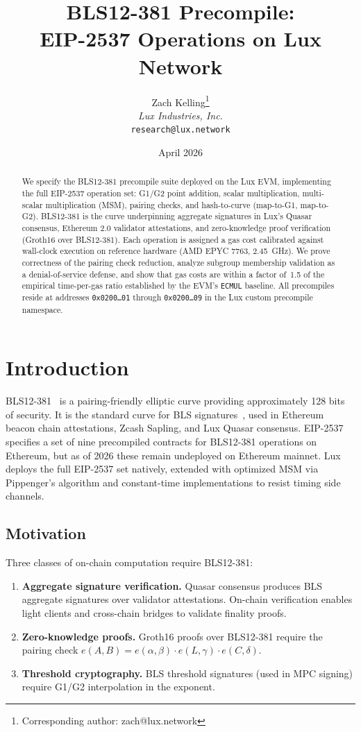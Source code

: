 \documentclass[11pt,a4paper]{article}
\title{BLS12-381 Precompile:\\EIP-2537 Operations on Lux Network}
\author{
Zach Kelling\thanks{Corresponding author: zach@lux.network}\\
\textit{Lux Industries, Inc.}\\
\texttt{research@lux.network}
}
\date{April 2026}
\begin{document}
\luxcoverpage

\begin{abstract}
We specify the BLS12-381 precompile suite deployed on the Lux EVM, implementing the full
EIP-2537 operation set: G1/G2 point addition, scalar multiplication, multi-scalar
multiplication (MSM), pairing checks, and hash-to-curve (map-to-G1, map-to-G2).
BLS12-381 is the curve underpinning aggregate signatures in Lux's Quasar consensus,
Ethereum 2.0 validator attestations, and zero-knowledge proof verification (Groth16
over BLS12-381). Each operation is assigned a gas cost calibrated against wall-clock
execution on reference hardware (AMD EPYC 7763, 2.45~GHz). We prove correctness of
the pairing check reduction, analyze subgroup membership validation as a
denial-of-service defense, and show that gas costs are within a factor of~1.5 of
the empirical time-per-gas ratio established by the EVM's \texttt{ECMUL} baseline.
All precompiles reside at addresses \texttt{0x0200\ldots01} through \texttt{0x0200\ldots09}
in the Lux custom precompile namespace.
\end{abstract}

\section{Introduction}

BLS12-381~\cite{bls12-381} is a pairing-friendly elliptic curve providing approximately
128 bits of security. It is the standard curve for BLS signatures~\cite{bls-sigs},
used in Ethereum beacon chain attestations, Zcash Sapling, and Lux Quasar consensus.
EIP-2537~\cite{eip2537} specifies a set of nine precompiled contracts for BLS12-381
operations on Ethereum, but as of 2026 these remain undeployed on Ethereum mainnet.
Lux deploys the full EIP-2537 set natively, extended with optimized MSM via Pippenger's
algorithm and constant-time implementations to resist timing side channels.

\subsection{Motivation}

Three classes of on-chain computation require BLS12-381:

\begin{enumerate}[label=(\roman*)]
  \item \textbf{Aggregate signature verification.} Quasar consensus produces BLS
    aggregate signatures over validator attestations. On-chain verification enables
    light clients and cross-chain bridges to validate finality proofs.
  \item \textbf{Zero-knowledge proofs.} Groth16 proofs over BLS12-381 require the
    pairing check $e(A, B) = e(\alpha, \beta) \cdot e(L, \gamma) \cdot e(C, \delta)$.
  \item \textbf{Threshold cryptography.} BLS threshold signatures (used in MPC
    signing) require G1/G2 interpolation in the exponent.
\end{enumerate}
\end{document}
